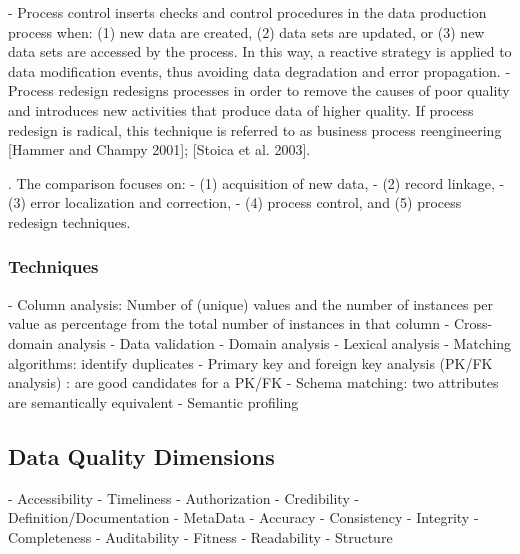 \documentclass[pdftex,english,oribibl]{llncs}
\begin{document}
    - Process control inserts checks and control procedures in the data production process when: (1) new data are created, (2) data sets are updated, or (3) new data sets are accessed by the process. In this way, a reactive strategy is applied to data modification events, thus avoiding data degradation and error propagation.
    - Process redesign redesigns processes in order to remove the causes of poor quality and introduces new activities that produce data of higher quality. If process redesign is radical, this technique is referred to as business process reengineering [Hammer and Champy 2001]; [Stoica et al. 2003].

    . The comparison focuses on:
    - (1) acquisition of new data,
    - (2) record linkage,
    - (3) error localization and correction,
    - (4) process control, and (5) process redesign techniques.

    \subsubsection{Techniques}
    - Column analysis: Number of (unique) values and the number of instances per value as percentage from the total number of instances in that column
    - Cross-domain analysis
    - Data validation
    - Domain analysis
    - Lexical analysis
    - Matching algorithms: identify duplicates
    - Primary key and foreign key analysis (PK/FK analysis) : are good candidates for a PK/FK
    - Schema matching: two attributes are semantically equivalent
    - Semantic profiling

    \subsection{Data Quality Dimensions}
    - Accessibility
    - Timeliness
    - Authorization
    - Credibility
    - Definition/Documentation
    - MetaData
    - Accuracy
    - Consistency
    - Integrity
    - Completeness
    - Auditability
    - Fitness
    - Readability
    - Structure
\end{document}
